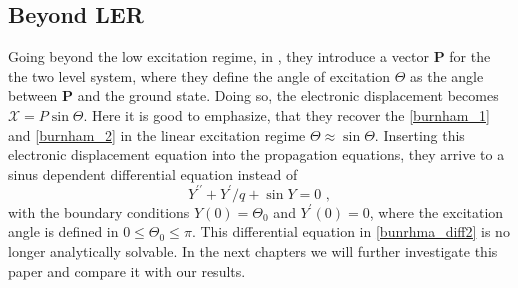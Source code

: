 \subsection{Beyond LER}
Going beyond the low excitation regime, in \cite{BURNHAM1969}, they introduce a vector \textbf{P} for the the two level system, where they define the angle of excitation $\Theta$ as the angle between \textbf{P} and the ground state. Doing so, the electronic displacement becomes $\mathcal{X} = P \sin{\Theta}$. Here it is good to emphasize, that they recover the \cref{burnham_1} and \cref{burnham_2} in the linear excitation regime $\Theta \approx \sin{\Theta}$. Inserting this electronic displacement equation into the propagation equations, they arrive to a sinus dependent differential equation instead of 
\begin{equation}
    Y^{\prime \prime} + Y^\prime/q + \sin Y = 0\, \label{bunrhma_diff2}\, ,
\end{equation}
with the boundary conditions $Y(0) = \Theta_0$ and $Y^\prime(0) = 0$, where the excitation angle is defined in $0 \le \Theta_0 \le \pi $. This differential equation in \ref{bunrhma_diff2} is no longer analytically solvable. In the next chapters we will further investigate this paper and compare it with our results. 
